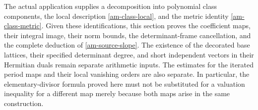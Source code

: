 The actual application supplies a decomposition into polynomial class
components, the local description \eqref{am-class-local}, and the
metric identity \eqref{am-class-metric}. Given these identifications,
this section proves the coefficient maps, their integral image,
their norm bounds, the determinant-frame cancellation, and the complete
deduction of \eqref{am-source-slope}. The existence of the decorated
base lattices, their specified determinant degree, and short independent
vectors in their Hermitian duals remain separate arithmetic inputs.
The estimates for the iterated period maps and their local vanishing
orders are also separate. In particular, the elementary-divisor formula
proved here must not be substituted for a valuation inequality for a
different map merely because both maps arise in the same construction.


